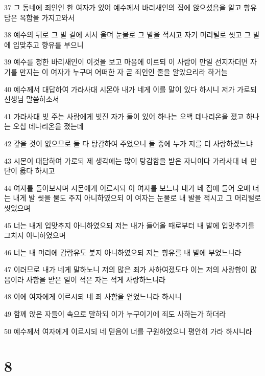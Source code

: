 \par 37 그 동네에 죄인인 한 여자가 있어 예수께서 바리새인의 집에 앉으셨음을 알고 향유 담은 옥합을 가지고와서
\par 38 예수의 뒤로 그 발 곁에 서서 울며 눈물로 그 발을 적시고 자기 머리털로 씻고 그 발에 입맞추고 향유를 부으니
\par 39 예수를 청한 바리새인이 이것을 보고 마음에 이르되 이 사람이 만일 선지자더면 자기를 만지는 이 여자가 누구며 어떠한 자 곧 죄인인 줄을 알았으리라 하거늘
\par 40 예수께서 대답하여 가라사대 시몬아 내가 네게 이를 말이 있다 하시니 저가 가로되 선생님 말씀하소서
\par 41 가라사대 빚 주는 사람에게 빚진 자가 둘이 있어 하나는 오백 데나리온을 졌고 하나는 오십 데나리온을 졌는데
\par 42 갚을 것이 없으므로 둘 다 탕감하여 주었으니 둘 중에 누가 저를 더 사랑하겠느냐
\par 43 시몬이 대답하여 가로되 제 생각에는 많이 탕감함을 받은 자니이다 가라사대 네 판단이 옳다 하시고
\par 44 여자를 돌아보시며 시몬에게 이르시되 이 여자를 보느냐 내가 네 집에 들어 오매 너는 내게 발 씻을 물도 주지 아니하였으되 이 여자는 눈물로 내 발을 적시고 그 머리털로 씻었으며
\par 45 너는 내게 입맞추지 아니하였으되 저는 내가 들어올 때로부터 내 발에 입맞추기를 그치지 아니하였으며
\par 46 너는 내 머리에 감람유도 붓지 아니하였으되 저는 향유를 내 발에 부었느니라
\par 47 이러므로 내가 네게 말하노니 저의 많은 죄가 사하여졌도다 이는 저의 사랑함이 많음이라 사함을 받은 일이 적은 자는 적게 사랑하느니라
\par 48 이에 여자에게 이르시되 네 죄 사함을 얻었느니라 하시니
\par 49 함께 앉은 자들이 속으로 말하되 이가 누구이기에 죄도 사하는가 하더라
\par 50 예수께서 여자에게 이르시되 네 믿음이 너를 구원하였으니 평안히 가라 하시니라

\chapter{8}

